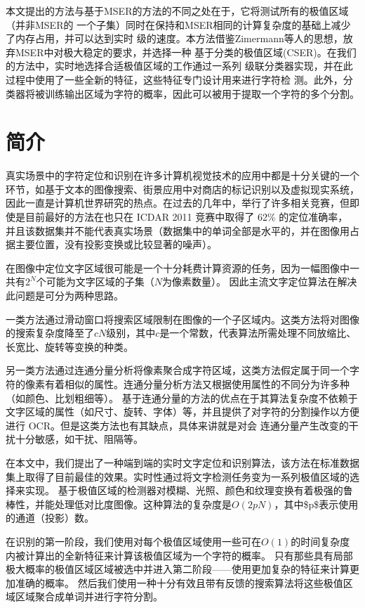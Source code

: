 \documentclass[UTF8]{ctexart}
\begin{document}
本文提出的方法与基于MSER的方法的不同之处在于，它将测试所有的极值区域（并非MSER的
一个子集）同时在保持和MSER相同的计算复杂度的基础上减少了内存占用，并可以达到实时
级的速度。本方法借鉴Zimermann等人的思想，放弃MSER中对极大稳定的要求，并选择一种
基于分类的极值区域(CSER)。在我们的方法中，实时地选择合适极值区域的工作通过一系列
级联分类器实现，并在此过程中使用了一些全新的特征，这些特征专门设计用来进行字符检
测。此外，分类器将被训练输出区域为字符的概率，因此可以被用于提取一个字符的多个分割。

\section{简介}

真实场景中的字符定位和识别在许多计算机视觉技术的应用中都是十分关键的一个环节，如基于文本的图像搜索、街景应用中对商店的标记识别以及虚拟现实系统，
因此一直是计算机世界研究的热点。在过去的几年中，举行了许多相关竞赛，但即使是目前最好的方法在也只在 ICDAR 2011 竞赛中取得了 62\% 的定位准确率，
并且该数据集并不能代表真实场景（数据集中的单词全部是水平的，并在图像用占据主要位置，没有投影变换或比较显著的噪声）。

在图像中定位文字区域很可能是一个十分耗费计算资源的任务，因为一幅图像中一共有$2^N$个可能为文字区域的子集（$N$为像素数量）。
因此主流文字定位算法在解决此问题是可分为两种思路。

一类方法通过滑动窗口将搜索区域限制在图像的一个子区域内。这类方法将对图像的搜索复杂度降至了$cN$级别，其中$c$是一个常数，代表算法所需处理不同放缩比、长宽比、旋转等变换的种类。

另一类方法通过连通分量分析将像素聚合成字符区域，这类方法假定属于同一个字符的像素有着相似的属性。连通分量分析方法又根据使用属性的不同分为许多种（如颜色、比划粗细等）。
基于连通分量的方法的优点在于其算法复杂度不依赖于文字区域的属性（如尺寸、旋转、字体）等，并且提供了对字符的分割操作以方便进行 OCR。但是这类方法也有其缺点，具体来讲就是对会
连通分量产生改变的干扰十分敏感，如干扰、阻隔等。

在本文中，我们提出了一种端到端的实时文字定位和识别算法，该方法在标准数据集上取得了目前最佳的效果。实时性通过将文字检测任务变为一系列极值区域的选择来实现。
基于极值区域的检测器对模糊、光照、颜色和纹理变换有着极强的鲁棒性，并能处理低对比度图像。这种算法的复杂度是$O(2pN)$，其中\$p\$表示使用的通道（投影）数。


在识别的第一阶段，我们使用对每个极值区域使用一些可在$O(1)$的时间复杂度内被计算出的全新特征来计算该极值区域为一个字符的概率。
只有那些具有局部极大概率的极值区域区域被选中并进入第二阶段——使用更加复杂的特征来计算更加准确的概率。
然后我们使用一种十分有效且带有反馈的搜索算法将这些极值区域区域聚合成单词并进行字符分割。
\end{document}
